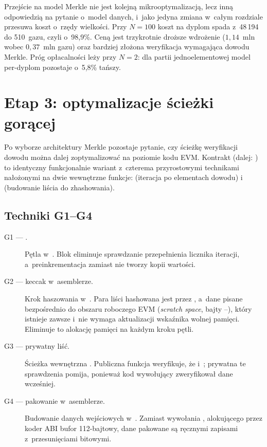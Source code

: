 \noindent Przejście na model Merkle nie jest kolejną mikrooptymalizacją, lecz
inną odpowiedzią na pytanie o~model danych, i~jako jedyna zmiana w~całym
rozdziale przesuwa koszt o~rzędy wielkości. Przy $N=100$ koszt na dyplom spada
z~48\,194 do 510~gazu, czyli o~98{,}9\%. Ceną jest trzykrotnie droższe wdrożenie
($1{,}14$~mln wobec $0{,}37$~mln gazu) oraz bardziej złożona weryfikacja
wymagająca dowodu Merkle. Próg opłacalności leży przy $N=2$: dla partii
jednoelementowej model per-dyplom pozostaje o~5{,}8\% tańszy.

\section{Etap 3: optymalizacje ścieżki gorącej}
\label{sec:gaz-etap3}

Po wyborze architektury Merkle pozostaje pytanie, czy ścieżkę weryfikacji dowodu
można dalej zoptymalizować na poziomie kodu EVM. Kontrakt
 (dalej: ) to identyczny funkcjonalnie wariant
 z~czterema przyrostowymi technikami nałożonymi na dwie
wewnętrzne funkcje:  (iteracja po elementach dowodu)
i~ (budowanie liścia do zhashowania).

\subsection{Techniki G1--G4}

\begin{description}
  \item[G1 --- .] Pętla w~. Blok
         eliminuje sprawdzanie przepełnienia licznika
        iteracji, a~preinkrementacja  zamiast  nie tworzy
        kopii wartości.
  \item[G2 --- keccak w~asemblerze.] Krok haszowania w~.
        Para liści hashowana jest przez , a~dane
        pisane bezpośrednio do obszaru roboczego EVM (\emph{scratch space}, bajty
        --), który istnieje zawsze i~nie wymaga aktualizacji
        wskaźnika wolnej pamięci. Eliminuje to alokację pamięci na każdym kroku
        pętli.
  \item[G3 --- prywatny liść.] Ścieżka wewnętrzna . Publiczna
        funkcja  weryfikuje, że 
        i~; prywatna  te sprawdzenia
        pomija, ponieważ kod wywołujący zweryfikował dane wcześniej.
  \item[G4 --- pakowanie w~asemblerze.] Budowanie danych wejściowych
        w~. Zamiast wywołania
        , alokującego przez koder ABI bufor 112-bajtowy, dane pakowane są
        ręcznymi zapisami  z~przesunięciami bitowymi.
\end{description}

